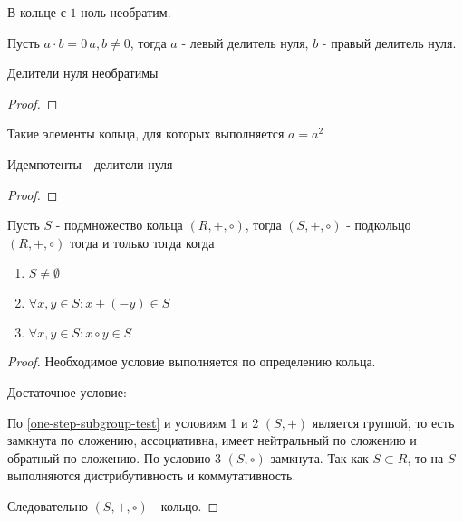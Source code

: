 \documentclass[../main/document.tex]{subfiles}
\begin{document}
\begin{cnsq}
В кольце с $1$ ноль необратим.
\end{cnsq}
\begin{dfn}
Пусть $a\cdot b=0\, a,b\neq 0$, тогда $a$ - левый делитель нуля, $b$ - правый делитель нуля.
\end{dfn}
\begin{exm}

\end{exm}
\begin{thm}
Делители нуля необратимы
\begin{proof}

\end{proof}
\end{thm}
\begin{dfn}
Такие элементы кольца, для которых выполняется $a=a^2$
\end{dfn}
\begin{thm}
Идемпотенты - делители нуля
\begin{proof}

\end{proof}
\end{thm}
\begin{dfn}

\end{dfn}
\begin{dfn}[Подкольцо]

\end{dfn}
\begin{thm}\label{subring-test}
Пусть $S$ - подмножество кольца $(R,+,\circ)$, тогда $(S,+,\circ)$ - подкольцо $(R,+,\circ)$ тогда и только тогда когда
\begin{enumerate}
\item $S\neq \emptyset$
\item $\forall x,y\in S:x+(-y)\in S$
\item $\forall x,y\in S:x\circ y\in S$
\end{enumerate}
\begin{proof}
Необходимое условие выполняется по определению кольца.

Достаточное условие:

По \ref{one-step-subgroup-test} и условиям 1 и 2 $(S,+)$ является группой, то есть замкнута по сложению, ассоциативна, имеет нейтральный по сложению и обратный по сложению. По условию 3 $(S,\circ)$ замкнута. Так как $S\subset R$, то на $S$ выполняются дистрибутивность и коммутативность.

Следовательно $(S,+,\circ)$ - кольцо.
\end{proof}
\end{thm}
\end{document}
